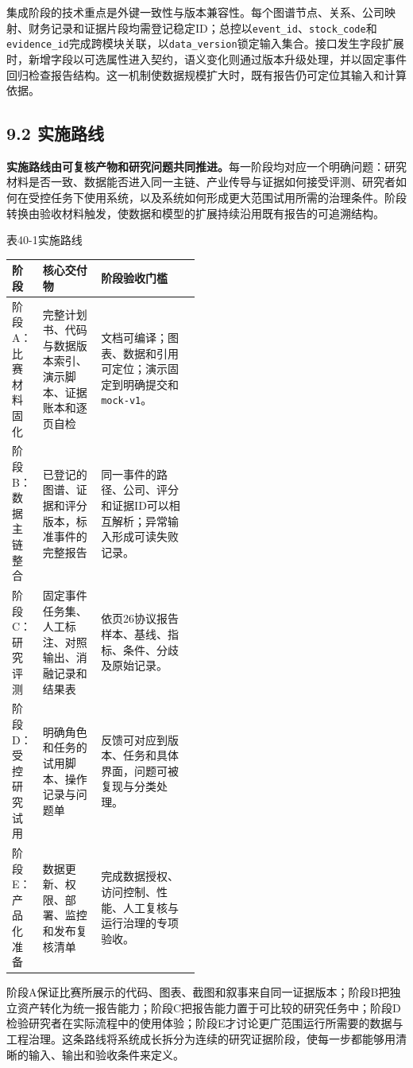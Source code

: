 集成阶段的技术重点是外键一致性与版本兼容性。每个图谱节点、关系、公司映射、财务记录和证据片段均需登记稳定ID；总控以\texttt{event\_id}、\texttt{stock\_code}和\texttt{evidence\_id}完成跨模块关联，以\texttt{data\_version}锁定输入集合。接口发生字段扩展时，新增字段以可选属性进入契约，语义变化则通过版本升级处理，并以固定事件回归检查报告结构。这一机制使数据规模扩大时，既有报告仍可定位其输入和计算依据。


\subsection*{9.2 实施路线}\label{page:40}
\noindent\textbf{实施路线由可复核产物和研究问题共同推进。}每一阶段均对应一个明确问题：研究材料是否一致、数据能否进入同一主链、产业传导与证据如何接受评测、研究者如何在受控任务下使用系统，以及系统如何形成更大范围试用所需的治理条件。阶段转换由验收材料触发，使数据和模型的扩展持续沿用既有报告的可追溯结构。

\begin{center}\small 表40-1\quad 实施路线\par\vspace{1mm}
\begin{tabularx}{\linewidth}{p{0.16\linewidth}p{0.31\linewidth}X}
\toprule
阶段 & 核心交付物 & 阶段验收门槛\\
\midrule
阶段A：比赛材料固化 & 完整计划书、代码与数据版本索引、演示脚本、证据账本和逐页自检 & 文档可编译；图表、数据和引用可定位；演示固定到明确提交和\texttt{mock-v1}。\\
阶段B：数据主链整合 & 已登记的图谱、证据和评分版本，标准事件的完整报告 & 同一事件的路径、公司、评分和证据ID可以相互解析；异常输入形成可读失败记录。\\
阶段C：研究评测 & 固定事件任务集、人工标注、对照输出、消融记录和结果表 & 依页26协议报告样本、基线、指标、条件、分歧及原始记录。\\
阶段D：受控研究试用 & 明确角色和任务的试用脚本、操作记录与问题单 & 反馈可对应到版本、任务和具体界面，问题可被复现与分类处理。\\
阶段E：产品化准备 & 数据更新、权限、部署、监控和发布复核清单 & 完成数据授权、访问控制、性能、人工复核与运行治理的专项验收。\\
\bottomrule
\end{tabularx}\end{center}

阶段A保证比赛所展示的代码、图表、截图和叙事来自同一证据版本；阶段B把独立资产转化为统一报告能力；阶段C把报告能力置于可比较的研究任务中；阶段D检验研究者在实际流程中的使用体验；阶段E才讨论更广范围运行所需要的数据与工程治理。这条路线将系统成长拆分为连续的研究证据阶段，使每一步都能够用清晰的输入、输出和验收条件来定义。

